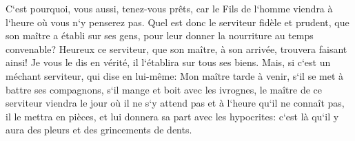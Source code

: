 \verse C`est pourquoi, vous aussi, tenez-vous prêts, car le Fils de l`homme viendra à l`heure où vous n`y penserez pas. 
\verse Quel est donc le serviteur fidèle et prudent, que son maître a établi sur ses gens, pour leur donner la nourriture au temps convenable? 
\verse Heureux ce serviteur, que son maître, à son arrivée, trouvera faisant ainsi! 
\verse Je vous le dis en vérité, il l`établira sur tous ses biens. 
\verse Mais, si c`est un méchant serviteur, qui dise en lui-même: Mon maître tarde à venir, 
\verse s`il se met à battre ses compagnons, s`il mange et boit avec les ivrognes, 
\verse le maître de ce serviteur viendra le jour où il ne s`y attend pas et à l`heure qu`il ne connaît pas, 
\verse il le mettra en pièces, et lui donnera sa part avec les hypocrites: c`est là qu`il y aura des pleurs et des grincements de dents. 

